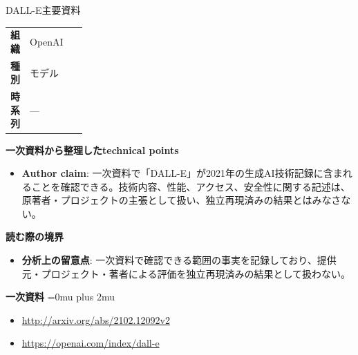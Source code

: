 \begin{technicalnote}{DALL-E}{主要資料}
\begingroup
\begin{tabularx}{\linewidth}{@{}>{\bfseries}p{0.22\linewidth}X@{}}
組織 & OpenAI \\
種別 & モデル \\
時系列 & — \\
\end{tabularx}
\smallskip
{\bfseries 一次資料から整理したtechnical points}
\begin{itemize}[leftmargin=1.5em,itemsep=0.35em]
\item \textbf{Author claim}: 一次資料で「DALL-E」が2021年の生成AI技術記録に含まれることを確認できる。技術内容、性能、アクセス、安全性に関する記述は、原著者・プロジェクトの主張として扱い、独立再現済みの結果とはみなさない。
\end{itemize}
\begin{minipage}{\linewidth}
{\bfseries 読む際の境界}
\begin{itemize}[leftmargin=1.5em,itemsep=0.35em]
\item \textbf{分析上の留意点}: 一次資料で確認できる範囲の事実を記録しており、提供元・プロジェクト・著者による評価を独立再現済みの結果として扱わない。
\end{itemize}
\begin{samepage}
{\bfseries 一次資料}
\begingroup\sloppy
\Urlmuskip=0mu plus 2mu\relax
\begin{itemize}[leftmargin=1.5em,itemsep=0.25em]
\item {\scriptsize\url{http://arxiv.org/abs/2102.12092v2}}
\item {\scriptsize\url{https://openai.com/index/dall-e}}
\end{itemize}
\endgroup
\end{samepage}
\end{minipage}
\endgroup
\end{technicalnote}
\medskip
